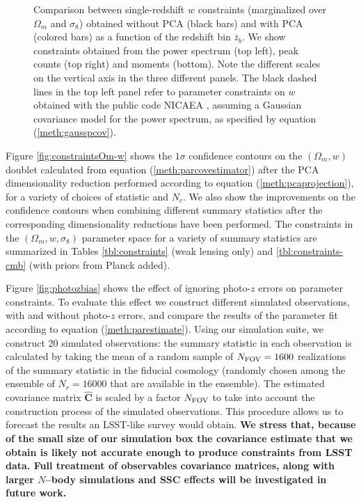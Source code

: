 \documentclass[reprint,aps,prd,superscriptaddress,showkeys,showpacs]{revtex4-1}
\newcommand{\bbh}[1]{\mathbf{\hat{#1}}}
\begin{document}
\begin{figure}
\caption{Comparison between single-redshift $w$ constraints (marginalized over $\Omega_m$ and $\sigma_8$) obtained without PCA (black bars) and with PCA (colored bars) as a function of the redshift bin $\bar{z}_b$. We show constraints obtained from the power spectrum (top left), peak counts (top right) and moments (bottom). Note the different scales on the vertical axis in the three different panels. The black dashed lines in the top left panel refer to parameter constraints on $w$ obtained with the public code NICAEA \citep{Nicaea}, assuming a Gaussian covariance model for the power spectrum, as specified by equation (\ref{meth:gausspcov}).}
\label{fig:nopca}
\end{figure}

Figure \ref{fig:constraintsOm-w} shows the $1\sigma$ confidence contours on the $(\Omega_m,w)$ doublet calculated from equation (\ref{meth:parcovestimator}) after the PCA dimensionality reduction performed according to equation (\ref{meth:pcaprojection}), for a variety of choices of statistic and $N_c$. We also show the improvements on the confidence contours when combining different summary statistics after the corresponding dimensionality reductions have been performed. The constraints in the $(\Omega_m,w,\sigma_8)$ parameter space for a variety of summary statistics are summarized in Tables \ref{tbl:constraints} (weak lensing only) and \ref{tbl:constraints-cmb} (with priors from Planck added). 

Figure \ref{fig:photozbias} shows the effect of ignoring photo-$z$ errors on parameter constraints. To evaluate this effect we construct different simulated observations, with and without photo-$z$ errors, and compare the results of the parameter fit according to equation (\ref{meth:parestimate}). Using our simulation suite, we construct 20 simulated observations: the summary statistic in each observation is calculated by taking the mean of a random sample of $N_{\rm FOV}=1600$ realizations of the summary statistic in the fiducial cosmology (randomly chosen among the ensemble of $N_r=16000$ that are available in the ensemble). The estimated covariance matrix $\bbh{C}$ is scaled by a factor $N_{\rm FOV}$ to take into account the construction process of the simulated observations. This procedure allows us to forecast the results an LSST-like survey would obtain. { \bf \color{red} We stress that, because of the small size of our simulation box the covariance estimate that we obtain is likely not accurate enough to produce constraints from LSST data. Full treatment of observables covariance matrices, along with larger $N$--body simulations and SSC effects will be investigated in future work.}       
\end{document}
